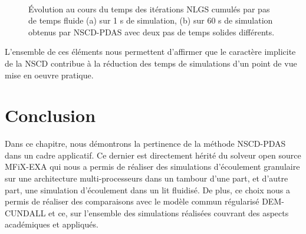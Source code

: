 \begin{figure}[h!]
\hspace{\fill}
   \\
\caption{Évolution au cours du temps des itérations NLGS cumulés par pas de temps fluide (a) sur 1 s de simulation, (b) sur 60 s de simulation obtenus par NSCD-PDAS avec deux pas de temps solides différents.}\label{nscd_cumul_nlgs_per_fluid}
\end{figure}

L'ensemble de ces éléments nous permettent d'affirmer que le caractère implicite de la NSCD contribue à la réduction des temps de simulations d'un point de vue mise en oeuvre pratique.

\newpage

\section*{Conclusion}

Dans ce chapitre, nous démontrons la pertinence de la méthode NSCD-PDAS dans un cadre applicatif. Ce dernier est directement hérité du solveur open source MFiX-EXA qui nous a permis de réaliser des simulations d'écoulement granulaire sur une architecture multi-processeurs dans un tambour d'une part, et d'autre part, une simulation d'écoulement dans un lit fluidisé.
De plus, ce choix nous a permis de réaliser des comparaisons avec le modèle commun régularisé DEM-CUNDALL et ce, sur l'ensemble des simulations réalisées couvrant des aspects académiques et appliqués.\\


